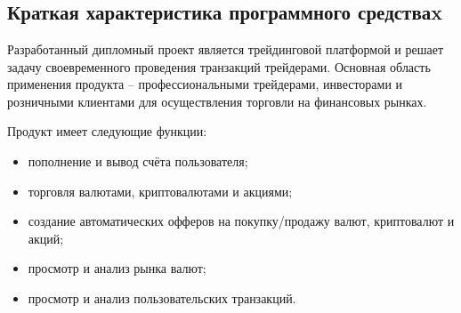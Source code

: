 \section{\texorpdfstring{\MakeUppercase \economicalPartName}{\economicalPartName}}


\subsection{Краткая характеристика программного средстваx}


Разработанный дипломный проект является трейдинговой платформой и решает задачу своевременного проведения транзакций трейдерами.
Основная область применения продукта -- профессиональными трейдерами, инвесторами и розничными клиентами для осуществления торговли на финансовых рынках.

Продукт имеет следующие функции:
\begin{itemize}
  \item пополнение и вывод счёта пользователя;
  \item торговля валютами, криптовалютами и акциями;
  \item создание автоматических офферов на покупку/продажу валют, криптовалют и акций;
  \item просмотр и анализ рынка валют;
  \item просмотр и анализ пользовательских транзакций.
\end{itemize}

